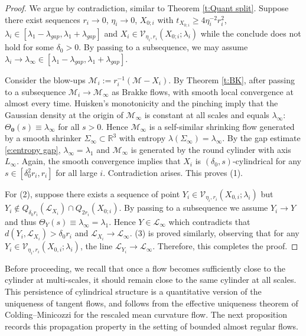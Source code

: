 \documentclass[11pt,reqno]{amsart}
\numberwithin{equation}{section}
\newcommand{\RR}{\mathds{R}}
\newcommand{\cL}{\mathcal{L}}
\newcommand{\cM}{\mathcal{M}}
\newcommand{\cV}{\mathcal{V}}
\theoremstyle{definition}
\theoremstyle{remark}
\theoremstyle{remark}
\theoremstyle{remark}
\theoremstyle{remark}\newtheorem{conjecture}[equation]{Conjecture}
\theoremstyle{remark}\newtheorem{question}[equation]{Question}
\begin{document}
\begin{proof}
    We argue by contradiction, similar to Theorem \ref{t:Quant split}. Suppose there exist sequences $r_i \to 0$, $\eta_i \to 0$, $X_{0;i}$ with $t_{X_{0;i}} \ge 4\eta^{-2}_i r_i^2$, $\lambda_i \in [\lambda_1 -\lambda_{gap}, \lambda_1+\lambda_{gap}]$  and $X_i \in \cV_{\eta_i,r_i}(X_{0;i};\lambda_i)$ while the conclude does not hold for some $\delta_0>0$. By passing to a subsequence, we may assume $\lambda_i \to \lambda_{\infty} \in [\lambda_1-\lambda_{gap},\lambda_1 +  \lambda_{gap}]$. 
    
    Consider the blow-ups $\cM_i := r_i^{-1}(\cM-X_i)$. By Theorem \ref{t:BK}, after passing to a subsequence $\cM_i \to \cM_\infty$ as Brakke flows, with smooth local convergence at almost every time. Huisken's monotonicity and the pinching imply that the Gaussian density at the origin of $\cM_\infty$ is constant at all scales and equals $\lambda_\infty$: $\Theta_{\mathbf 0}(s)\equiv \lambda_\infty$ for all $s>0$. Hence $\cM_\infty$ is a self-similar shrinking flow generated by a smooth shrinker $\Sigma_\infty\subset\RR^3$ with entropy $\lambda(\Sigma_\infty)=\lambda_\infty$. By the gap estimate \eqref{e:entropy gap}, $\lambda_{\infty} = \lambda_1$ and $\cM_{\infty}$ is generated by the round cylinder with axis $L_{\infty}$. Again, the smooth convergence  implies that $X_i$ is $(\delta_0, s)$-cylindrical for any $s\in [\delta_0^2r_i, r_i]$ for all large $i$. Contradiction arises. This proves (1). 

    For (2), suppose there exists a sequence of point $Y_i \in \cV_{\eta_i,r_i}(X_{0,i};\lambda_i)$ but $Y_i \notin Q_{\delta_0 r_i}(\cL_{X_i})\cap Q_{2r_i}(X_{0;i})$. By passing to a subsequence we assume $Y_i \to Y$ and thus $\Theta_Y(s) \equiv \lambda_{\infty} = \lambda_1$. Hence $Y \in \cL_{\infty}$ which contradicts that $d(Y_i,\cL_{X_i}) > \delta_0 r_i$ and $\cL_{X_i} \to \cL_{\infty}$. (3) is proved similarly, observing that for any $Y_i \in \cV_{\eta_i,r_i}(X_{0,i};\lambda_i)$, the line $\cL_{Y_i} \to \cL_{\infty}$. Therefore, this completes the proof.
\end{proof}



Before proceeding, we recall that once a flow becomes sufficiently close to the cylinder at multi-scales, it should remain close to the same cylinder at all scales. This persistence of cylindrical structure is a quantitative version of the uniqueness of tangent flows, and follows from the effective uniqueness theorem of Colding--Minicozzi \cite{CM25} for the rescaled mean curvature flow. The next proposition records this propagation property in the setting of bounded almost regular flows.
\end{document}
